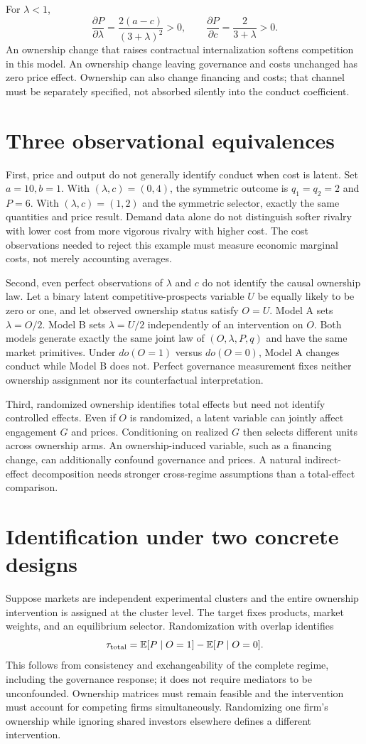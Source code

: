 \documentclass[11pt]{article}
\newcommand{\E}{\mathbb E}
\begin{document}
For $\lambda<1$,
\[
 \frac{\partial P}{\partial\lambda}=\frac{2(a-c)}{(3+\lambda)^2}>0,
 \qquad
 \frac{\partial P}{\partial c}=\frac{2}{3+\lambda}>0.
\]
An ownership change that raises contractual internalization softens competition in this model. An ownership change leaving governance and costs unchanged has zero price effect. Ownership can also change financing and costs; that channel must be separately specified, not absorbed silently into the conduct coefficient.

\section*{Three observational equivalences}
First, price and output do not generally identify conduct when cost is latent. Set $a=10,b=1$. With $(\lambda,c)=(0,4)$, the symmetric outcome is $q_1=q_2=2$ and $P=6$. With $(\lambda,c)=(1,2)$ and the symmetric selector, exactly the same quantities and price result. Demand data alone do not distinguish softer rivalry with lower cost from more vigorous rivalry with higher cost. The cost observations needed to reject this example must measure economic marginal costs, not merely accounting averages.

Second, even perfect observations of $\lambda$ and $c$ do not identify the causal ownership law. Let a binary latent competitive-prospects variable $U$ be equally likely to be zero or one, and let observed ownership status satisfy $O=U$. Model A sets $\lambda=O/2$. Model B sets $\lambda=U/2$ independently of an intervention on $O$. Both models generate exactly the same joint law of $(O,\lambda,P,q)$ and have the same market primitives. Under $do(O=1)$ versus $do(O=0)$, Model A changes conduct while Model B does not. Perfect governance measurement fixes neither ownership assignment nor its counterfactual interpretation.

Third, randomized ownership identifies total effects but need not identify controlled effects. Even if $O$ is randomized, a latent variable can jointly affect engagement $G$ and prices. Conditioning on realized $G$ then selects different units across ownership arms. An ownership-induced variable, such as a financing change, can additionally confound governance and prices. A natural indirect-effect decomposition needs stronger cross-regime assumptions than a total-effect comparison.

\section*{Identification under two concrete designs}
Suppose markets are independent experimental clusters and the entire ownership intervention is assigned at the cluster level. The target fixes products, market weights, and an equilibrium selector. Randomization with overlap identifies
\[
 \tau_{\rm total}=\E[P\mid O=1]-\E[P\mid O=0].
\]
This follows from consistency and exchangeability of the complete regime, including the governance response; it does not require mediators to be unconfounded. Ownership matrices must remain feasible and the intervention must account for competing firms simultaneously. Randomizing one firm's ownership while ignoring shared investors elsewhere defines a different intervention.
\end{document}
